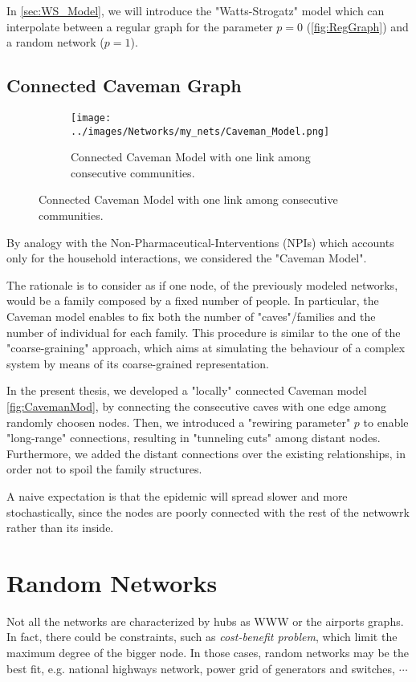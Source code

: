 \documentclass[a4paper,10pt, oneside]{book} %
\theoremstyle{definition}
\begin{document}
In \autoref{sec:WS_Model}, we will introduce the "Watts-Strogatz" model which can interpolate between a regular graph for the parameter $p = 0$ (\autoref{fig:RegGraph}) and a random network ($p=1$).

\subsection{Connected Caveman Graph}
\begin{figure}[ht]
    \begin{subfigure}{\textwidth}
        \texttt{[image: ../images/Networks/my\_nets/Caveman\_Model.png]}
        \centering
        \caption{Connected Caveman Model with one link among consecutive communities.}
        \label{fig:CavemanMod}
    \end{subfigure}
\end{figure}

By analogy with the Non-Pharmaceutical-Interventions (NPIs) which accounts only for the household interactions, we considered the "Caveman Model".

The rationale is to consider as if one node, of the previously modeled networks, would be a family composed by a fixed number of people. In particular, the Caveman model enables to fix both the number of "caves"/families and the number of individual for each family. This procedure is similar to the one of the "coarse-graining" approach, which aims at simulating the behaviour of a complex system by means of its coarse-grained representation.

In the present thesis, we developed a "locally" connected Caveman model \autoref{fig:CavemanMod}, by connecting the consecutive caves with one edge among randomly choosen nodes. Then, we introduced a "rewiring parameter" $ p$ to enable "long-range" connections, resulting in "tunneling cuts" among distant nodes. Furthermore, we added the distant connections over the existing relationships, in order not to spoil the family structures.

A naive expectation is that the epidemic will spread slower and more stochastically, since the nodes are poorly connected with the rest of the netwowrk rather than its inside.

\section{Random Networks}
Not all the networks are characterized by hubs as WWW or the airports graphs.
In fact, there could be constraints, such as \textit{cost-benefit problem}, which limit the maximum degree of the bigger node. In those cases, random networks may be the best fit, e.g. national highways network, power grid of generators and switches, $\cdots$
\end{document}
